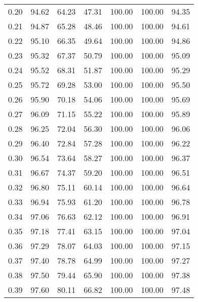 \begin{tabular}{|c|c|c|c|c|c|c|}
      0.20 &     94.62 &     64.23 &      47.31 &  100.00 &     100.00 &         94.35 \\
      0.21 &     94.87 &     65.28 &      48.46 &  100.00 &     100.00 &         94.61 \\
      0.22 &     95.10 &     66.35 &      49.64 &  100.00 &     100.00 &         94.86 \\
      0.23 &     95.32 &     67.37 &      50.79 &  100.00 &     100.00 &         95.09 \\
      0.24 &     95.52 &     68.31 &      51.87 &  100.00 &     100.00 &         95.29 \\
      0.25 &     95.72 &     69.28 &      53.00 &  100.00 &     100.00 &         95.50 \\
      0.26 &     95.90 &     70.18 &      54.06 &  100.00 &     100.00 &         95.69 \\
      0.27 &     96.09 &     71.15 &      55.22 &  100.00 &     100.00 &         95.89 \\
      0.28 &     96.25 &     72.04 &      56.30 &  100.00 &     100.00 &         96.06 \\
      0.29 &     96.40 &     72.84 &      57.28 &  100.00 &     100.00 &         96.22 \\
      0.30 &     96.54 &     73.64 &      58.27 &  100.00 &     100.00 &         96.37 \\
      0.31 &     96.67 &     74.37 &      59.20 &  100.00 &     100.00 &         96.51 \\
      0.32 &     96.80 &     75.11 &      60.14 &  100.00 &     100.00 &         96.64 \\
      0.33 &     96.94 &     75.93 &      61.20 &  100.00 &     100.00 &         96.78 \\
      0.34 &     97.06 &     76.63 &      62.12 &  100.00 &     100.00 &         96.91 \\
      0.35 &     97.18 &     77.41 &      63.15 &  100.00 &     100.00 &         97.04 \\
      0.36 &     97.29 &     78.07 &      64.03 &  100.00 &     100.00 &         97.15 \\
      0.37 &     97.40 &     78.78 &      64.99 &  100.00 &     100.00 &         97.27 \\
      0.38 &     97.50 &     79.44 &      65.90 &  100.00 &     100.00 &         97.38 \\
      0.39 &     97.60 &     80.11 &      66.82 &  100.00 &     100.00 &         97.48 \\

\end{tabular}
